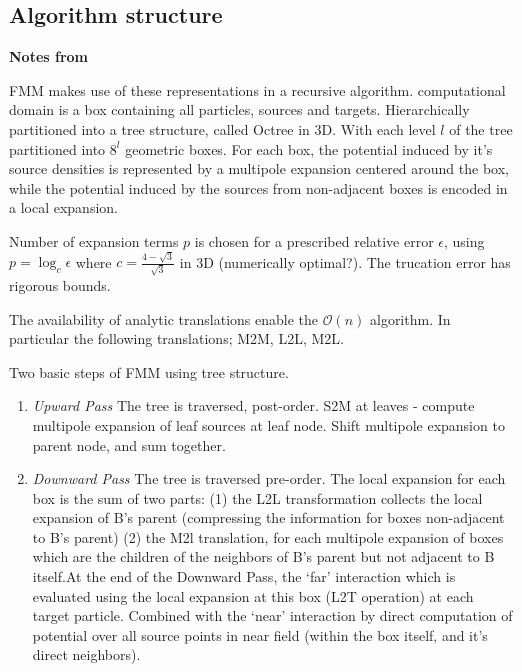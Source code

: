 \subsection{Algorithm structure}

\textbf{Notes from \cite{Ying:2004:JCP}}

FMM makes use of these representations in a recursive algorithm. computational
domain is a box containing all particles, sources and targets. Hierarchically
partitioned into a tree structure, called Octree in 3D. With each level $l$ of the
tree partitioned into $8^l$ geometric boxes. For each box, the potential induced
by it's source densities is represented by a multipole expansion centered around
the box, while the potential induced by the sources from non-adjacent boxes is
encoded in a local expansion.

Number of expansion terms $p$ is chosen for a prescribed relative error $\epsilon$,
using $p=\log_c \epsilon$ where $c=\frac{4-\sqrt{3}}{\sqrt{3}}$ in 3D (numerically optimal?).
The trucation error has rigorous bounds.

The availability of analytic translations enable the $\mathcal{O}(n)$ algorithm.
In particular the following translations; M2M, L2L, M2L.

Two basic steps of FMM using tree structure.

\begin{enumerate}
    \item \textit{Upward Pass} The tree is traversed, post-order. S2M at leaves
    - compute multipole expansion of leaf sources at leaf node. Shift multipole
    expansion to parent node, and sum together.
    \item \textit{Downward Pass} The tree is traversed pre-order. The local expansion
    for each box is the sum of two parts: (1) the L2L transformation collects the local
    expansion of B's parent (compressing the information for boxes non-adjacent to B's parent)
    (2) the M2l translation, for each multipole expansion of boxes which are the children of
    the neighbors of B's parent but not adjacent to B itself.At the end of the
    Downward Pass, the `far' interaction which is evaluated
    using the local expansion at this box (L2T operation) at each target particle.
    Combined with the `near' interaction by direct computation of potential over all
    source points in near field (within the box itself, and it's direct neighbors).
\end{enumerate}




